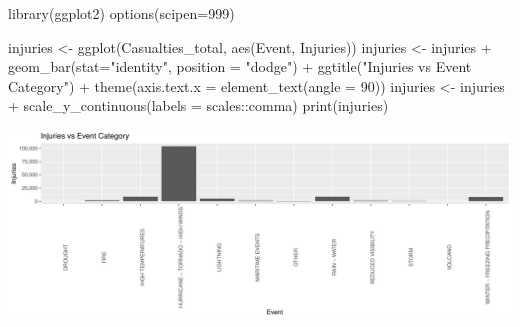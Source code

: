 \documentclass[
]{article}
\newenvironment{Shaded}{\begin{snugshade}}{\end{snugshade}}
\newcommand{\AttributeTok}[1]{\textcolor[rgb]{0.77,0.63,0.00}{#1}}
\newcommand{\DecValTok}[1]{\textcolor[rgb]{0.00,0.00,0.81}{#1}}
\newcommand{\FunctionTok}[1]{\textcolor[rgb]{0.00,0.00,0.00}{#1}}
\newcommand{\NormalTok}[1]{#1}
\newcommand{\OtherTok}[1]{\textcolor[rgb]{0.56,0.35,0.01}{#1}}
\newcommand{\SpecialCharTok}[1]{\textcolor[rgb]{0.00,0.00,0.00}{#1}}
\newcommand{\StringTok}[1]{\textcolor[rgb]{0.31,0.60,0.02}{#1}}
\begin{document}
\begin{Shaded}
\begin{Highlighting}[]
\FunctionTok{library}\NormalTok{(ggplot2)}
\FunctionTok{options}\NormalTok{(}\AttributeTok{scipen=}\DecValTok{999}\NormalTok{)}

\NormalTok{injuries }\OtherTok{\textless{}{-}} \FunctionTok{ggplot}\NormalTok{(Casualties\_total, }\FunctionTok{aes}\NormalTok{(Event, Injuries))}
\NormalTok{injuries }\OtherTok{\textless{}{-}}\NormalTok{ injuries }\SpecialCharTok{+} \FunctionTok{geom\_bar}\NormalTok{(}\AttributeTok{stat=}\StringTok{"identity"}\NormalTok{, }\AttributeTok{position =} \StringTok{"dodge"}\NormalTok{) }\SpecialCharTok{+} \FunctionTok{ggtitle}\NormalTok{(}\StringTok{"Injuries vs Event Category"}\NormalTok{) }\SpecialCharTok{+} \FunctionTok{theme}\NormalTok{(}\AttributeTok{axis.text.x =} \FunctionTok{element\_text}\NormalTok{(}\AttributeTok{angle =} \DecValTok{90}\NormalTok{))}
\NormalTok{injuries }\OtherTok{\textless{}{-}}\NormalTok{ injuries }\SpecialCharTok{+} \FunctionTok{scale\_y\_continuous}\NormalTok{(}\AttributeTok{labels =}\NormalTok{ scales}\SpecialCharTok{::}\NormalTok{comma)}
\FunctionTok{print}\NormalTok{(injuries)}
\end{Highlighting}
\end{Shaded}

\includegraphics{RepData_PeerAssessment2_files/figure-latex/Injuries Results-1.pdf}
\end{document}
